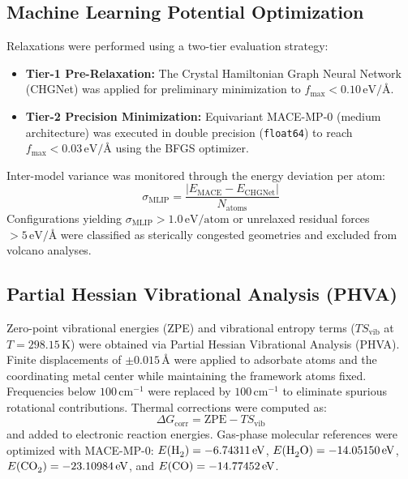 \documentclass[journal=jacsat,manuscript=article]{achemso}
\begin{document}
\subsection{Machine Learning Potential Optimization}
Relaxations were performed using a two-tier evaluation strategy:
\begin{itemize}
    \item \textbf{Tier-1 Pre-Relaxation:} The Crystal Hamiltonian Graph Neural Network (CHGNet)\cite{deng2023chgnet} was applied for preliminary minimization to $f_{\text{max}} < 0.10\,\text{eV/\AA}$.
    \item \textbf{Tier-2 Precision Minimization:} Equivariant MACE-MP-0 (medium architecture)\cite{batatia2022mace} was executed in double precision (\texttt{float64}) to reach $f_{\text{max}} < 0.03\,\text{eV/\AA}$ using the BFGS optimizer.
\end{itemize}
Inter-model variance was monitored through the energy deviation per atom:
\begin{equation}
\sigma_{\text{MLIP}} = \frac{|E_{\text{MACE}} - E_{\text{CHGNet}}|}{N_{\text{atoms}}}
\end{equation}
Configurations yielding $\sigma_{\text{MLIP}} > 1.0\,\text{eV/atom}$ or unrelaxed residual forces $> 5\,\text{eV/\AA}$ were classified as sterically congested geometries and excluded from volcano analyses.

\subsection{Partial Hessian Vibrational Analysis (PHVA)}
Zero-point vibrational energies (ZPE) and vibrational entropy terms ($T S_{\text{vib}}$ at $T = 298.15\,\text{K}$) were obtained via Partial Hessian Vibrational Analysis (PHVA).\cite{li2014partial} Finite displacements of $\pm 0.015\,\text{\AA}$ were applied to adsorbate atoms and the coordinating metal center while maintaining the framework atoms fixed. Frequencies below $100\,\text{cm}^{-1}$ were replaced by $100\,\text{cm}^{-1}$ to eliminate spurious rotational contributions. Thermal corrections were computed as:
\begin{equation}
\Delta G_{\text{corr}} = \text{ZPE} - T S_{\text{vib}}
\end{equation}
and added to electronic reaction energies. Gas-phase molecular references were optimized with MACE-MP-0: $E(\ce{H2}) = -6.74311\,\text{eV}$, $E(\ce{H2O}) = -14.05150\,\text{eV}$, $E(\ce{CO2}) = -23.10984\,\text{eV}$, and $E(\ce{CO}) = -14.77452\,\text{eV}$.
\end{document}
